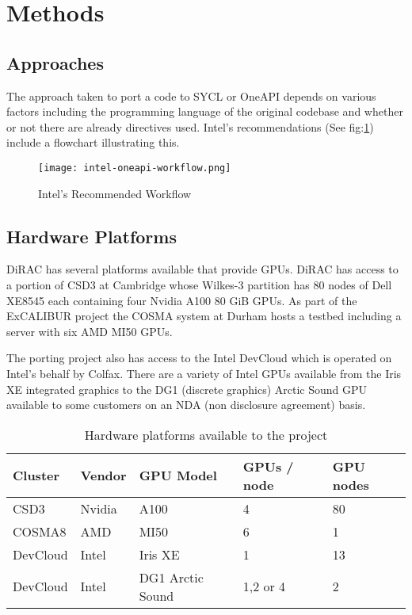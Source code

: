 \documentclass[main]{subfiles}
\begin{document}
\section{Methods}\label{sec:methods}
\subsection{Approaches}\label{sec:approaches}

The approach taken to port a code to SYCL or OneAPI\cite{intel_corp_oneapi_nodate} depends on various factors including the programming language of the original codebase and whether or not there are already directives used. Intel's recommendations (See fig:\ref{fig:intel-workflow}) include a flowchart illustrating this.

\begin{figure}[htb]
	\caption{Intel's Recommended Workflow}
	\texttt{[image: intel-oneapi-workflow.png]}
	\label{fig:intel-workflow} %
\end{figure}

\subsection{Hardware Platforms}

DiRAC has several platforms available that provide GPUs. DiRAC has access to a portion of CSD3 at Cambridge whose Wilkes-3 partition has 80 nodes of Dell XE8545 each containing four Nvidia A100 80 GiB GPUs. As part of the ExCALIBUR project the COSMA system at Durham hosts a testbed including a server with six AMD MI50 GPUs.

The porting project also has access to the Intel DevCloud which is operated on Intel's behalf by Colfax. There are a variety of Intel GPUs available from the Iris XE integrated graphics to the DG1 (discrete graphics) Arctic Sound GPU available to some customers on an NDA (non disclosure agreement) basis.

\begin{table}[htbp]
	\centering
	\begin{tabular}{lllll}
		Cluster  & Vendor & GPU Model        & GPUs / node & GPU nodes \\
		\hline  %
		CSD3     & Nvidia & A100             & 4           & 80        \\
		COSMA8   & AMD    & MI50             & 6           & 1         \\
		DevCloud & Intel  & Iris XE          & 1           & 13        \\
		DevCloud & Intel  & DG1 Arctic Sound & 1,2 or 4    & 2
	\end{tabular}
	\caption{Hardware platforms available to the project}
	\label{tab:GPUs} %
\end{table}
\end{document}
